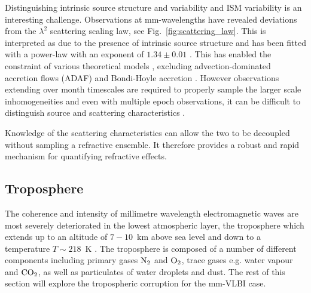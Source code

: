 Distinguishing intrinsic source structure and variability and ISM variability is an interesting challenge. Observations at mm-wavelengths have revealed deviations from the $\lambda^2$ scattering scaling law, see Fig.~\ref{fig:scattering_law}. This is interpreted as due to the presence of intrinsic source structure and has been fitted with a power-law with an exponent of $1.34 \pm 0.01$ \cite{Lu_2011}. This has enabled the constraint of various theoretical models \cite{Bower_2006}, excluding advection-dominated accretion flows (ADAF) \cite{Narayan_1998} and Bondi-Hoyle accretion \cite{Melia_1994}. However observations extending over month timescales are required to properly sample the larger scale inhomogeneities and even with multiple epoch observations, it can be difficult to distinguish source and scattering characteristics \citep*{Macquart_2006}.

Knowledge of the scattering characteristics can allow the two to be decoupled without sampling a refractive ensemble. It therefore provides
a robust and rapid mechanism for quantifying refractive effects.



\subsection{Troposphere}

The coherence and intensity of millimetre wavelength electromagnetic waves are most severely deteriorated in the lowest atmospheric layer, the troposphere which extends up to an altitude of $7-10$~km above sea level and down to a temperature $T \sim 218$~K \citep{Thompson_2001}. The troposphere is composed of a number of different components including primary gases $\rm N_2$ and  $\rm O_2$, trace gases e.g. water vapour and ${\rm CO_2}$, as well as particulates of water droplets and dust. The rest of this section will explore the tropospheric corruption for the mm-VLBI case. 


